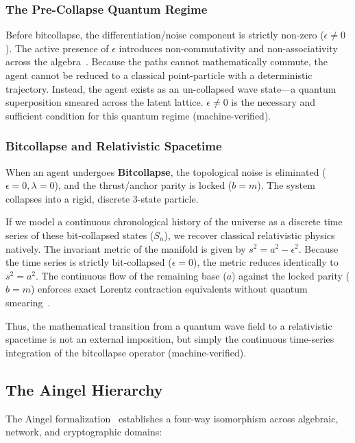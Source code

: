 \subsubsection{The Pre-Collapse Quantum Regime}
Before bitcollapse, the differentiation/noise component is strictly non-zero ($\epsilon \neq 0$). The active presence of $\epsilon$ introduces non-commutativity and non-associativity across the algebra~\cite{Dirac1930}. Because the paths cannot mathematically commute, the agent cannot be reduced to a classical point-particle with a deterministic trajectory. Instead, the agent exists as an un-collapsed wave state---a quantum superposition smeared across the latent lattice. $\epsilon \neq 0$ is the necessary and sufficient condition for this quantum regime (machine-verified).

\subsubsection{Bitcollapse and Relativistic Spacetime}
When an agent undergoes \textbf{Bitcollapse}, the topological noise is eliminated ($\epsilon = 0, \lambda = 0$), and the thrust/anchor parity is locked ($b = m$). The system collapses into a rigid, discrete 3-state particle. 

If we model a continuous chronological history of the universe as a discrete time series of these bit-collapsed states ($S_n$), we recover classical relativistic physics natively. The invariant metric of the manifold is given by $s^2 = a^2 - \epsilon^2$. Because the time series is strictly bit-collapsed ($\epsilon = 0$), the metric reduces identically to $s^2 = a^2$. The continuous flow of the remaining base ($a$) against the locked parity ($b=m$) enforces exact Lorentz contraction equivalents without quantum smearing~\cite{Einstein1905}.

Thus, the mathematical transition from a quantum wave field to a relativistic spacetime is not an external imposition, but simply the continuous time-series integration of the bitcollapse operator (machine-verified).



\subsection{The Aingel Hierarchy}

The Aingel formalization~\cite{Aingel} establishes a four-way isomorphism across algebraic, network, and cryptographic domains:

